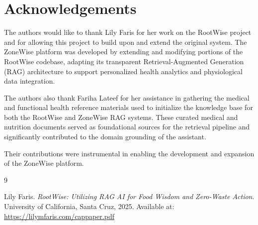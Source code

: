 \documentclass[11pt,twocolumn]{article}
\begin{document}
\section*{Acknowledgements}

The authors would like to thank Lily Faris for her work on the RootWise project and for allowing this project to build upon and extend the original system. The ZoneWise platform was developed by extending and modifying portions of the RootWise codebase, adapting its transparent Retrieval-Augmented Generation (RAG) architecture to support personalized health analytics and physiological data integration.

The authors also thank Fariha Lateef for her assistance in gathering the medical and functional health reference materials used to initialize the knowledge base for both the RootWise and ZoneWise RAG systems. These curated medical and nutrition documents served as foundational sources for the retrieval pipeline and significantly contributed to the domain grounding of the assistant.

Their contributions were instrumental in enabling the development and expansion of the ZoneWise platform.

\begin{thebibliography}{9}

Lily Faris.
\textit{RootWise: Utilizing RAG AI for Food Wisdom and Zero-Waste Action}.
University of California, Santa Cruz, 2025.
Available at: \url{https://lilymfaris.com/cappaper.pdf}
\cite{faris2025rootwise}



\end{thebibliography}
\end{document}

